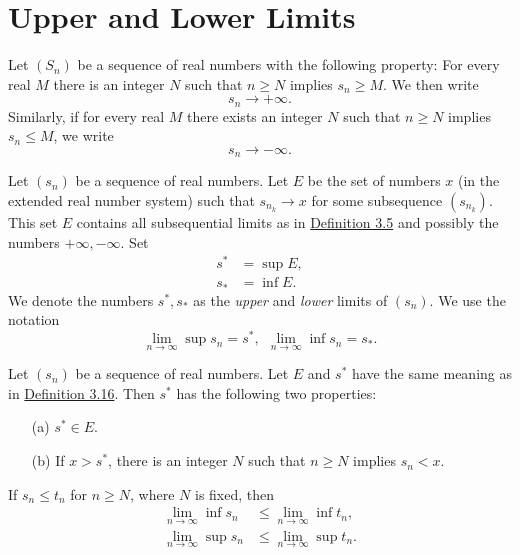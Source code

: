 \documentclass[11pt,a4paper]{book}
\begin{document}
\section{Upper and Lower Limits}

\begin{definition}[3.15]
    Let \( ({S}_{n}) \) be a sequence of real numbers with the following property: For every real \( M  \) there is an integer \( N \) such that \( n \geq N  \) implies \( {s}_{n} \geq M  \). We then write
    \[  {s}_{n} \to + \infty.  \]
    Similarly, if for every real \( M  \) there exists an integer \( N  \) such that \( n \geq N  \) implies \( {s}_{n} \leq M   \), we write
    \[  {s}_{n} \to -\infty.  \]
\end{definition}

\begin{definition}[3.16]\label{3.16}
    Let \( ({s}_{n}) \) be a sequence of real numbers. Let \( E  \) be the set of numbers \( x  \) (in the extended real number system) such that \( {s}_{{n}_{k}} \to x  \) for some subsequence \( ({s}_{{n}_{k}}) \). This set \( E  \) contains all subsequential limits as in {\hyperref[3.5]{Definition 3.5}} and possibly the numbers \( + \infty, - \infty   \). Set
    \begin{align*}
        s^{*} &= \sup E, \\
        {s}_{*} &= \inf E.
    \end{align*}
We denote the numbers \( s^{*}, {s}_{*} \) as the \textit{upper} and \textit{lower} limits of \( ({s}_{n}) \). We use the notation 
\[  \lim_{ n \to \infty  } \sup {s}_{n} = s^{*}, \ \ \lim_{ n \to \infty  } \inf {s}_{n} = {s}_{*}. \]
\end{definition}

\begin{theorem}[3.17]
    Let \( ({s}_{n}) \) be a sequence of real numbers. Let \( E  \) and \( s^{*} \) have the same meaning as in {\hyperref[3.16]{Definition 3.16}}. Then \( s^{*}  \) has the following two properties:
    \begin{enumerate}
        \item[(a)] \( s^{*} \in E  \).
        \item[(b)] If \( x > s^{*} \), there is an integer \( N  \) such that \( n \geq N  \) implies \( {s}_{n} < x  \).
    \end{enumerate}
\end{theorem}

\begin{theorem}[3.19]\label{3.19}
   If \( {s}_{n} \leq {t}_{n} \) for \( n \geq N  \), where \( N  \) is fixed, then 
   \begin{align*}
       \lim_{ n \to \infty  } \inf {s}_{n} &\leq \lim_{ n \to \infty  }  \inf {t}_{n}, \\
       \lim_{ n \to \infty  }  \sup {s}_{n} &\leq \lim_{ n \to \infty  } \sup {t}_{n}.
   \end{align*}
\end{theorem}
\end{document}
